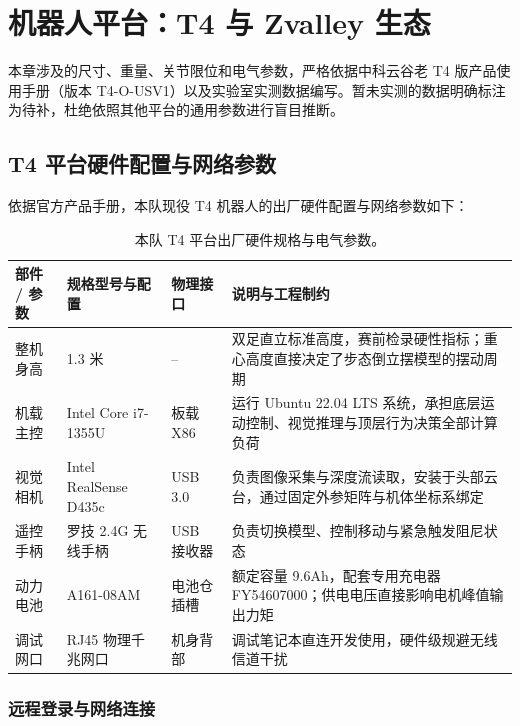 \section{机器人平台：T4 与 Zvalley 生态}

本章涉及的尺寸、重量、关节限位和电气参数，严格依据中科云谷老 T4 版产品使用手册（版本 T4-O-USV1）以及实验室实测数据编写。暂未实测的数据明确标注为待补，杜绝依照其他平台的通用参数进行盲目推断。\practice

\subsection{T4 平台硬件配置与网络参数}

依据官方产品手册，本队现役 T4 机器人的出厂硬件配置与网络参数如下：

\begin{table}[H]
\centering
\small
\begin{tabularx}{\textwidth}{p{2.6cm} p{3.4cm} p{2.2cm} X}
\toprule
\textbf{部件 / 参数} & \textbf{规格型号与配置} & \textbf{物理接口} & \textbf{说明与工程制约} \\
\midrule
整机身高 & 1.3 米 & -- & 双足直立标准高度，赛前检录硬性指标；重心高度直接决定了步态倒立摆模型的摆动周期 \\
\addlinespace
机载主控 & Intel Core i7-1355U & 板载 X86 & 运行 Ubuntu 22.04 LTS 系统，承担底层运动控制、视觉推理与顶层行为决策全部计算负荷 \\
\addlinespace
视觉相机 & Intel RealSense D435c & USB 3.0 & 负责图像采集与深度流读取，安装于头部云台，通过固定外参矩阵与机体坐标系绑定 \\
\addlinespace
遥控手柄 & 罗技 2.4G 无线手柄 & USB 接收器 & 负责切换模型、控制移动与紧急触发阻尼状态 \\
\addlinespace
动力电池 & A161-08AM & 电池仓插槽 & 额定容量 9.6Ah，配套专用充电器 FY54607000；供电电压直接影响电机峰值输出力矩 \\
\addlinespace
调试网口 & RJ45 物理千兆网口 & 机身背部 & 调试笔记本直连开发使用，硬件级规避无线信道干扰 \\
\bottomrule
\end{tabularx}
\caption{本队 T4 平台出厂硬件规格与电气参数。}
\end{table}

\subsubsection{远程登录与网络连接}

